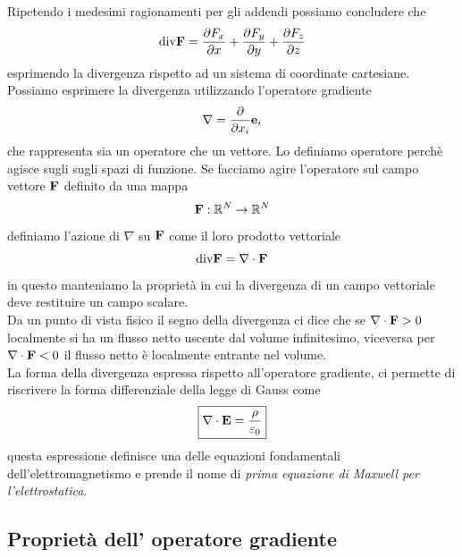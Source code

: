 Ripetendo i medesimi ragionamenti per gli addendi possiamo concludere che 
\begin{equation}
	\text{div}\bold{F} = \frac{\partial F_x}{\partial x} + \frac{\partial F_y}{\partial y} + \frac{\partial F_z}{\partial z}
\end{equation}
esprimendo la divergenza rispetto ad un sistema di coordinate cartesiane.
\\

\noindent Possiamo esprimere la divergenza utilizzando l'operatore gradiente 
\begin{equation*}
	\nabla = \frac{\partial }{\partial x_i}\bold{e}_i
\end{equation*}
che rappresenta sia un operatore che un vettore. Lo definiamo operatore perch\`e agisce sugli sugli spazi di funzione. Se facciamo agire l'operatore sul campo vettore $\bold{F}$ definito da una mappa
\begin{equation*}
	\bold{F} : \mathbb{R}^N \to \mathbb{R}^N
\end{equation*}
definiamo l'azione di $\nabla $ su $\bold{F}$ come il loro prodotto vettoriale 
\begin{equation}
	\text{div} \bold{F} = \nabla \cdot \bold{F} 
\end{equation}
in questo manteniamo la propriet\`a in cui la divergenza di un campo vettoriale deve restituire un campo scalare.
\\

\noindent Da un punto di vista fisico il segno della divergenza ci dice che se $\nabla \cdot \bold{F}>0$ localmente si ha un flusso netto uscente dal volume infinitesimo, viceversa per $\nabla \cdot \bold{F} < 0$ il flusso netto \`e localmente entrante nel volume.
\\

\noindent La forma della divergenza espressa rispetto all'operatore gradiente, ci permette di riscrivere la forma differenziale della legge di Gauss come
\begin{equation}
\boxed{
	\nabla \cdot \bold{E} = \frac{\rho}{\varepsilon_0}}
\end{equation}
questa espressione definisce una delle equazioni fondamentali dell'elettromagnetismo e prende il nome di \textit{prima equazione di Maxwell per l'elettrostatica}.


\subsection{Propriet\`a dell' operatore gradiente }

